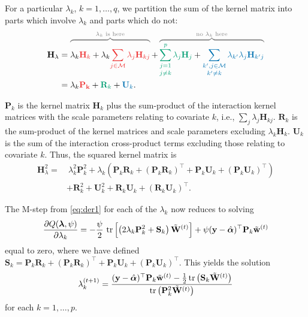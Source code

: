
For a particular $\lambda_k$, $k=1,\dots,q$, we partition the sum of the kernel matrix into parts which involve $\lambda_k$ and parts which do not:
\begin{align}
	\mathbf H_{\lambda} &= {\color{gray}
	\overbrace{\color{black}\lambda_k{\color{colred}\mathbf H_k} + \lambda_k {\color{colred} \sum_{j\in \mathcal M}\lambda_j\mathbf H_{kj}}\vphantom{\mathop{\sum_{j=1}^p}_{j\neq k}}}^{\lambda_k\text{ is here}}
	{\color{black}+}
	\overbrace{\color{black}{\color{colgre}\mathop{\sum_{j=1}^p}_{j\neq k}\lambda_j \mathbf H_j} + {\color{colblu}\mathop{\sum_{k',j \in \mathcal M}}_{k'\neq k}\lambda_{k'}\lambda_j \mathbf H_{k'j}}}^{\text{no $\lambda_k$ here}}
	} \nonumber \\
	&= \lambda_k\mathbf {\color{colred}P_k} + {\color{colgre}\mathbf R_k} + {\color{colblu}\mathbf U_k}.
\end{align}

$\mathbf P_k$ is the kernel matrix $\mathbf H_k$ plus the sum-product of the interaction kernel matrices with the scale parameters relating to covariate $k$, i.e., $\sum_j \lambda_j\mathbf H_{kj}$. $\mathbf R_k$ is the sum-product of the kernel matrices and scale parameters excluding $\lambda_k\mathbf H_k$. $\mathbf U_k$ is the sum of the interaction cross-product terms excluding those relating to covariate $k$. Thus, the squared kernel matrix is
\begin{align}\label{eq:kernpartsq}
		\mathbf H_{\lambda}^2 =& \ \lambda_k^2\mathbf P_k^2  + \lambda_k \left( \mathbf P_k\mathbf R_k + (\mathbf P_k\mathbf R_k)^\top + \mathbf P_k\mathbf U_k + (\mathbf P_k\mathbf U_k)^\top \right) \nonumber \\
		& + \mathbf R_k^2 + \mathbf U_k^2 + \mathbf R_k\mathbf U_k + (\mathbf R_k\mathbf U_k)^\top.
\end{align}

The M-step from \eqref{eq:der1} for each of the $\lambda_k$ now reduces to solving
\[
	\frac{\partial Q(\boldsymbol\lambda, \psi)}{\partial \lambda_k}
	= - \frac{\psi}{2} \, \operatorname{tr} \left[ \left( 2\lambda_k\mathbf P_k^2 + \mathbf S_k \right)  \tilde{{\mathbf W}}^{(t)} \right] + \psi(\mathbf y - \hat{\boldsymbol\alpha})^\top \mathbf P_k \tilde{{\mathbf w}}^{(t)}
\]
equal to zero, where we have defined $\mathbf S_k = \mathbf P_k\mathbf R_k + (\mathbf P_k\mathbf R_k)^\top + \mathbf P_k\mathbf U_k + (\mathbf P_k\mathbf U_k)^\top$. This yields the solution
\[
	\lambda_k^{(t+1)} = \frac{(\mathbf y - \hat{\boldsymbol\alpha})^\top \mathbf P_k \tilde{{\mathbf w}}^{(t)} - \frac{1}{2} \operatorname{tr} \big( \mathbf S_k \tilde{{\mathbf W}}^{(t)} \big)}{\operatorname{tr} \big( \mathbf P_k^2 \tilde{{\mathbf W}}^{(t)} \big)}
\]
for each $k = 1,\dots,p$.

